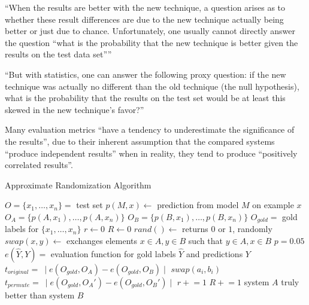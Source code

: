 ``When the results are better with the new technique, a question arises as to whether
these result differences are due to the new technique actually being better or just due to
chance. Unfortunately, one usually cannot directly answer the question “what is the probability
that the new technique is better given the results on the test data set”'' \citep{yeh2000more}

``But with statistics, one can answer the following proxy question: if the new technique was
actually no different than the old technique (the null hypothesis), what is the probability
that the results on the test set would be at least this skewed in the new technique’s
favor?'' \citep{yeh2000more}

Many evaluation metrics ``have a tendency to underestimate the significance of the results'',
due to their inherent assumption that the compared systems ``produce independent results''
when in reality, they tend to produce ``positively correlated results''. \citep{yeh2000more}


\begin{algorithm}
\caption{Approximate Randomization Algorithm}
\label{alg:approximate-randomization}
	\begin{algorithmic}[1]
    \STATE $O = \{x_1, \dotsc, x_n\} =$ test set
    \STATE $p(M,x) \leftarrow$ prediction from model $M$ on example $x$
    \STATE $O_A = \{p(A,x_1), \dotsc, p(A,x_n)\}$
    \STATE $O_B = \{p(B,x_1), \dotsc, p(B,x_n)\}$
    \STATE $O_{gold} =$ gold labels for $\{x_1, \dotsc, x_n\}$
    \STATE $r \leftarrow 0$
    \STATE $R \leftarrow 0$
    \STATE $rand() \leftarrow$ returns $0$ or $1$, randomly
    \STATE $swap(x,y) \leftarrow$ exchanges elements $x \in A,y \in B$ such that $y \in A, x \in B$
    \STATE $p = 0.05$
    \STATE $e(\hat{Y},Y) =$ evaluation function for gold labels $\hat{Y}$ and predictions $Y$
    \STATE $t_{original} =\ \mid e(O_{gold},O_A) - e(O_{gold},O_B) \mid$
          \STATE $swap(a_i,b_i)$
        \ENDIF
      \ENDFOR
      \STATE $t_{permute} =\ \mid e(O_{gold},O_A') - e(O_{gold},O_B') \mid$
        \STATE $r \mathrel{+}= 1$
      \ENDIF
      \STATE $R \mathrel{+}= 1$
    \ENDWHILE
      \STATE system $A$ truly better than system $B$
    \ENDIF
  \end{algorithmic}
\end{algorithm}


